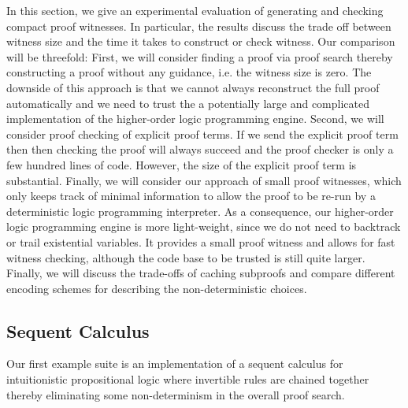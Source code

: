\documentclass{llncs}
\begin{document}
In this section, we give an experimental evaluation of generating and checking 
compact proof witnesses. In particular, the results discuss the
trade off between witness size and the time it takes to construct or check
witness. Our comparison will be threefold: First, we will consider
finding a proof via proof search thereby constructing a proof without
any guidance, i.e. the witness size is zero. The downside of this approach is
that we cannot always reconstruct the full proof automatically and we
need to trust the a potentially large and complicated implementation
of the higher-order logic programming engine.  Second, we will
consider proof checking of explicit proof terms. If we send the
explicit proof term then then checking the proof will always succeed
and the proof checker is only a few hundred lines of code. However,
the size of the explicit proof term is substantial. Finally, we will
consider our approach of small proof witnesses, which only keeps track
of minimal information to allow the proof to be re-run by a
deterministic logic programming interpreter. As a consequence, 
our higher-order logic programming engine is more light-weight, since
we do not need to backtrack or trail existential variables. It
provides a small proof witness and allows for fast witness checking,
although the code base to be trusted is still quite larger.
Finally, we will discuss the trade-offs of caching subproofs and compare
different encoding schemes for describing the non-deterministic choices.    

\subsection{Sequent Calculus}
Our first example suite is an implementation of a sequent calculus 
for intuitionistic propositional logic where invertible rules are
chained together thereby eliminating some non-determinism in the
overall proof search. 
\end{document}
